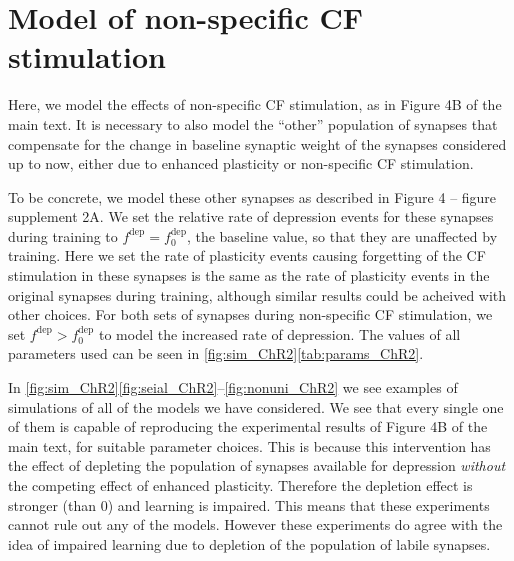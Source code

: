\documentclass[10pt]{article}
\newcommand{\dep}{^{\text{dep}}}
\newcommand{\norm}{_0}
\newcommand{\chrfig}[1][B]{Figure 4#1 of the main text}
\newcommand{\compfig}[1][A]{Figure 4 -- figure supplement 2#1}
\begin{document}


\section{Model of non-specific CF stimulation}\label{sec:chr2}

Here, we model the effects of non-specific CF stimulation, as in \chrfig.
It is necessary to also model the ``other'' population of synapses that compensate for the change in baseline synaptic weight of the synapses considered up to now, either due to enhanced plasticity or non-specific CF stimulation.

To be concrete, we model these other synapses as described in \compfig.
We set the relative rate of depression events for these synapses during training to $f\dep = f\dep\norm$, \ie the baseline value, so that they are unaffected by training.
Here we set the rate of plasticity events causing forgetting of the CF stimulation in these synapses is the same as the rate of plasticity events in the original synapses during training, although similar results could be acheived with other choices.
For both sets of synapses during non-specific CF stimulation, we set $f\dep > f\dep\norm$ to model the increased rate of depression.
The values of all parameters used can be seen in \autoref{fig:sim_ChR2}\ref{tab:params_ChR2}.

In \autoref{fig:sim_ChR2}\ref{fig:seial_ChR2}--\ref{fig:nonuni_ChR2} we see examples of simulations of all of the models we have considered.
We see that every single one of them is capable of reproducing the experimental results of \chrfig, for suitable parameter choices.
This is because this intervention has the effect of depleting the population of synapses available for depression \emph{without} the competing effect of enhanced plasticity.
Therefore the depletion effect is stronger (than 0) and learning is impaired.
This means that these experiments cannot rule out any of the models.
However these experiments do agree with the idea of impaired learning due to depletion of the population of labile synapses.
\end{document}
